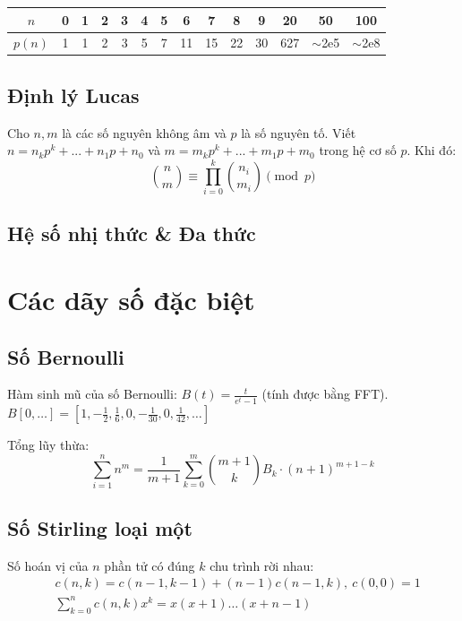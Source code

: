 		\begin{center}
		\begin{tabular}{c|c@{\ }c@{\ }c@{\ }c@{\ }c@{\ }c@{\ }c@{\ }c@{\ }c@{\ }c@{\ }c@{\ }c@{\ }c}
			$n$    & 0 & 1 & 2 & 3 & 4 & 5 & 6  & 7  & 8  & 9  & 20  & 50  & 100 \\ \hline
			$p(n)$ & 1 & 1 & 2 & 3 & 5 & 7 & 11 & 15 & 22 & 30 & 627 & $\mathtt{\sim}$2e5 & $\mathtt{\sim}$2e8 \\
		\end{tabular}
		\end{center}

	\subsection{Định lý Lucas}
		Cho $n,m$ là các số nguyên không âm và $p$ là số nguyên tố. Viết $n=n_kp^k+...+n_1p+n_0$ và $m=m_kp^k+...+m_1p+m_0$ trong hệ cơ số $p$. Khi đó:
		\[ \binom{n}{m} \equiv \prod_{i=0}^k\binom{n_i}{m_i} \pmod{p} \]

	\subsection{Hệ số nhị thức \& Đa thức}

\section{Các dãy số đặc biệt}
	\subsection{Số Bernoulli}
		Hàm sinh mũ của số Bernoulli: $B(t)=\frac{t}{e^t-1}$ (tính được bằng FFT).
		$B[0,\ldots] = [1, -\frac{1}{2}, \frac{1}{6}, 0, -\frac{1}{30}, 0, \frac{1}{42}, \ldots]$

		Tổng lũy thừa:
		\small
		\[ \sum_{i=1}^n n^m = \frac{1}{m+1} \sum_{k=0}^m \binom{m+1}{k} B_k \cdot (n+1)^{m+1-k} \]
		\normalsize

	\subsection{Số Stirling loại một}
		Số hoán vị của $n$ phần tử có đúng $k$ chu trình rời nhau:
		\begin{align*}
			&c(n,k) = c(n-1,k-1) + (n-1) c(n-1,k),\ c(0,0) = 1 \\
			&\textstyle \sum_{k=0}^n c(n,k)x^k = x(x+1) \dots (x+n-1)
		\end{align*}

